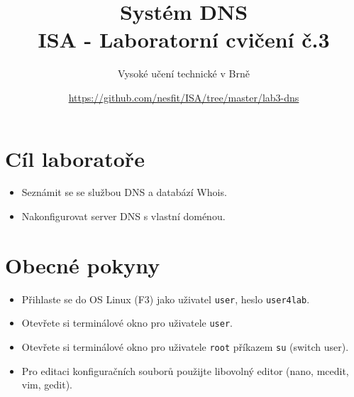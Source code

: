 \documentclass[a4paper,11pt]{article}
\title{Systém DNS\\
{\bf\large ISA - Laboratorní cvičení č.3}}
\author{Vysoké učení technické v Brně}
\date{\url{https://github.com/nesfit/ISA/tree/master/lab3-dns}}
\begin{document}
{\let\newpage\relax\maketitle}

\section*{Cíl laboratoře}
\begin{itemize}
  \item Seznámit se se službou DNS a databází Whois.
  \item Nakonfigurovat server DNS s vlastní doménou. 
\end{itemize}

\section*{Obecné pokyny}
\begin{itemize}
  \item Přihlaste se do OS Linux (F3) jako uživatel {\tt user}, heslo {\tt user4lab}.
  \item Otevřete si terminálové okno pro uživatele {\tt user}.
  \item Otevřete si terminálové okno pro uživatele {\tt root} příkazem {\tt su}
    (switch user).
  \item Pro editaci konfiguračních souborů použijte libovolný editor (nano, mcedit, vim, gedit).
\end{itemize}
\end{document}
